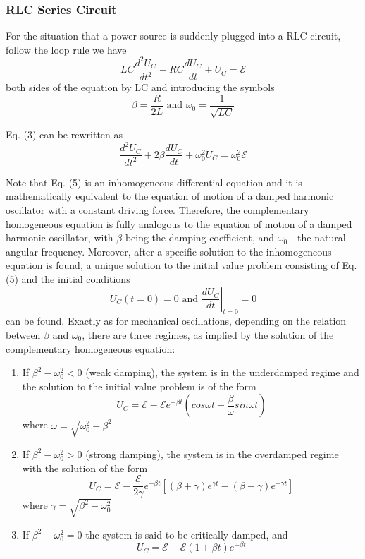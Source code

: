 \documentclass{article}
\begin{document}
\subsubsection{RLC Series Circuit}
For the situation that a power source is suddenly plugged into a RLC
circuit, follow the loop rule we have
\begin{equation}
	LC\dfrac{d^2U_C}{dt^2}+RC\dfrac{dU_C}{dt}+U_C=\mathcal{E}
\end{equation}
both sides of the equation by LC and introducing the symbols \begin{equation}
	\beta=\dfrac{R}{2L} \text{ and } \omega_0=\dfrac{1}{\sqrt{LC}}
\end{equation}

Eq. (3) can be rewritten as
\begin{equation}
	\dfrac{d^2U_C}{dt^2}+2\beta\dfrac{dU_C}{dt}+\omega_0^2U_C=\omega_0^2\mathcal{E}
\end{equation}

Note that Eq. (5) is an inhomogeneous differential equation and it is mathematically equivalent to the equation of motion of a damped harmonic oscillator with a constant driving force. Therefore, the complementary homogeneous equation is fully analogous to the equation of motion of a damped harmonic oscillator, with $ \beta $ being the damping coefficient, and $ \omega_0 $ - the natural angular frequency. Moreover, after a specific solution to the inhomogeneous equation is found, a unique solution to the initial value problem consisting of Eq. (5) and the initial conditions
\begin{equation}
	U_C(t=0)=0 \text{ and } \left.\dfrac{dU_C}{dt}\right|_{t=0}=0
\end{equation}
can be found.
Exactly as for mechanical oscillations, depending on the relation between $ \beta $ and $ \omega_0 $, there are three regimes, as implied by the solution of the complementary homogeneous equation:

\begin{enumerate}[$\blacktriangleright$]
	\item
	If $ \beta^2-\omega_0^2<0 $ (weak damping), the system is in the underdamped regime and the solution to the initial value problem is of the form
	$$ U_C=\mathcal{E}-\mathcal{E}e^{-\beta t}\left( cos\omega t+\dfrac{\beta}{\omega}sin\omega t \right) $$
	where $ \omega=\sqrt{\omega_0^2-\beta^2} $
	\item
	If $ \beta^2-\omega_0^2>0 $ (strong damping), the system is in the overdamped regime with the	solution of the form
	$$  U_C=\mathcal{E}-\dfrac{\mathcal{E}}{2\gamma}e^{-\beta t}[(\beta+\gamma)e^{\gamma t}-(\beta-\gamma)e^{-\gamma t}]  $$
	where $ \gamma=\sqrt{\beta^2-\omega_0^2} $
	\item
	If $ \beta^2-\omega_0^2=0 $ the system is said to be critically damped, and
	\begin{equation}
		U_C=\mathcal{E}-\mathcal{E}(1+\beta t)e^{-\beta t}
	\end{equation}
\end{enumerate}
\end{document}
